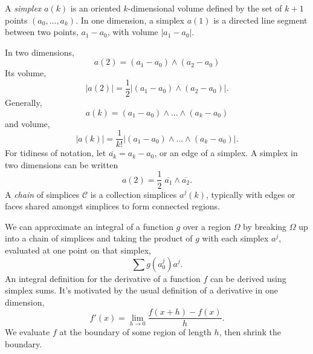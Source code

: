 	A \emph{simplex} $a\left(k\right)$ is an oriented $k$-dimensional volume defined by the set of $k + 1$ points $\left(a_0, ... , a_k\right)$. In one dimension, a simplex $a\left(1\right)$ is a directed line segment between two points, $a_1 - a_0$, with volume $|a_1 - a_0|$.
	
	In two dimensions, 	
	\[
	a\left(2\right) = \left(a_1 - a_0\right)\wedge\left(a_2 - a_0\right)
	\]
	Its volume, 
	\[
	|a\left(2\right)| = \frac{1}{2}|\left(a_1 - a_0\right) \wedge \left(a_2 - a_0\right)|.
	\]
	Generally,
	\[
	a\left(k\right) = \left(a_1 - a_0\right)\wedge ... \wedge\left(a_k - a_0\right)
	\]
	and volume,
	\[
	|a\left(k\right)| = \frac{1}{k!}|\left(a_1 - a_0\right) \wedge...\wedge \left(a_k - a_0\right)|.
	\]
	For tidiness of notation, let $\overline{a_k} = a_k - a_0$, or an edge of a simplex. A simplex in two dimensions can be written
	\[
	a\left(2\right) = \frac{1}{2}\;\overline{a_1} \wedge \overline{a_2}. 
	\] 	
	A \emph{chain} of simplices $\mathcal{C}$ is a collection simplices $a^j\left(k\right)$, typically with edges or faces shared amongst simplices to form connected regions.
	
	We can approximate an integral of a function $g$ over a region $\Omega$ by breaking $\Omega$ up into a chain of simplices and taking the product of $g$ with each simplex $a^j$, evaluated at one point on that simplex,
	\[
	\sum g\left(a^j_0\right) a^j.
	\]
	An integral definition for the derivative of a function $f$ can be derived using simplex sums. It's motivated by the usual definition of a derivative in one dimension,
	\[
	f'\left(x\right) = \lim_{h\rightarrow 0} \frac{f\left(x +h\right) - f\left(x\right)}{h}.
	\]
	We evaluate $f$ at the boundary of some region of length $h$, then shrink the boundary. 
	
